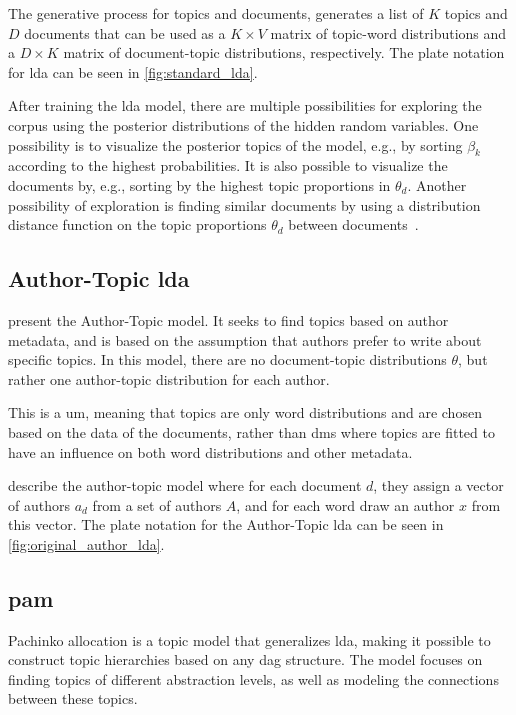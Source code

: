 The generative process for topics and documents, generates a list of $K$ topics and $D$ documents that can be used as a $K \times V$ matrix of topic-word distributions and a $D \times K$ matrix of document-topic distributions, respectively.
The plate notation for \gls{lda} can be seen in \autoref{fig:standard_lda}.



After training the \gls{lda} model, there are multiple possibilities for exploring the corpus using the posterior distributions of the hidden random variables.
One possibility is to visualize the posterior topics of the model, e.g., by sorting $\beta_k$ according to the highest probabilities.
It is also possible to visualize the documents by, e.g., sorting by the highest topic proportions in $\theta_d$.
Another possibility of exploration is finding similar documents by using a distribution distance function on the topic proportions $\theta_d$ between documents~\cite{blei2009topic}.


\subsection{Author-Topic \gls{lda}}\label{subsec:auth_prelim}
\citet{author_topic_2012} present the Author-Topic model.
It seeks to find topics based on author metadata, and is based on the assumption that authors prefer to write about specific topics.
In this model, there are no document-topic distributions $\theta$, but rather one author-topic distribution for each author.

This is a \gls{um}, meaning that topics are only word distributions and are chosen based on the data of the documents, rather than \glspl{dm} where topics are fitted to have an influence on both word distributions and other metadata.

\citet{author_topic_2012} describe the author-topic model where for each document $d$, they assign a vector of authors $a_d$ from a set of authors $A$, and for each word draw an author $x$ from this vector.
The plate notation for the Author-Topic \gls{lda} can be seen in \autoref{fig:original_author_lda}.

\subsection{\acrlong{pam}}\label{subsec:pachinko_prelim}
Pachinko allocation is a topic model that generalizes \gls{lda}, making it possible to construct topic hierarchies based on any \gls{dag} structure.
The model focuses on finding topics of different abstraction levels, as well as modeling the connections between these topics.

